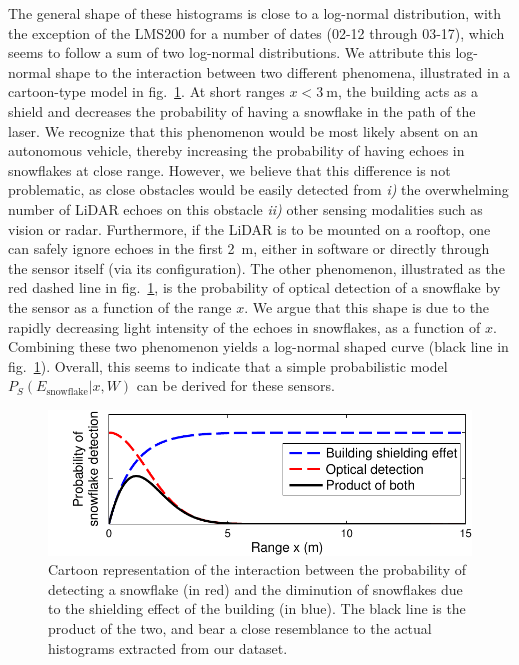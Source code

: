 
The general shape of these histograms is close to a log-normal distribution, with the exception of the LMS200 for a number of dates (02-12 through 03-17), which seems to follow a sum of two log-normal distributions. We attribute this log-normal shape to the interaction between two different phenomena, illustrated in a cartoon-type model in fig.~\ref{fig:CartoonModel}. At short ranges $x<\SI{3}{\meter}$, the building acts as a shield and decreases the probability of having a snowflake in the path of the laser. We recognize that this phenomenon would be most likely absent on an autonomous vehicle, thereby increasing the probability of having echoes in snowflakes at close range. However, we believe that this difference is not problematic, as close obstacles would be easily detected from \emph{i)} the overwhelming number of  LiDAR echoes on this obstacle \emph{ii)} other sensing modalities such as vision or radar. Furthermore, if the LiDAR is to be mounted on a rooftop, one can safely  ignore echoes in the first \SI{2}{\meter}, either in software or directly through the sensor itself (via its configuration). The other phenomenon, illustrated as the red dashed line in fig.~\ref{fig:CartoonModel}, is the probability of optical detection of a snowflake by the sensor as a function of the range $x$. We argue that this shape is due to the rapidly decreasing light intensity of the echoes in snowflakes, as a function of $x$. Combining these two phenomenon yields a log-normal shaped curve (black line in fig.~\ref{fig:CartoonModel}). Overall, this seems to indicate that a simple probabilistic model $P_S(E_\text{snowflake}|x,W)$ can be derived for these sensors. 

\begin{figure}[th]
    \centering
    \includegraphics[trim={0.6cm 0 0 0},clip,width=0.97\linewidth]{./img/ShieldingModel.pdf}
    \caption{Cartoon representation of the interaction between the probability of detecting a snowflake (in red) and the diminution of snowflakes due to the shielding effect of the building (in blue). The black line is the product of the two, and bear a close resemblance to the actual histograms extracted from our dataset.}
    \label{fig:CartoonModel}
\end{figure}

